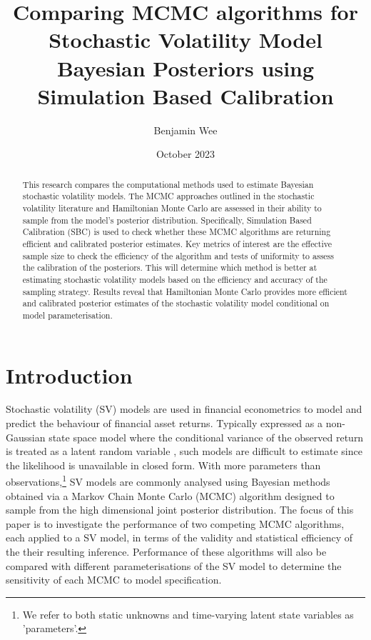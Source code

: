 \documentclass[12pt, a4paper]{article}
\title{Comparing MCMC algorithms for Stochastic Volatility Model Bayesian Posteriors using Simulation Based Calibration}
\author{Benjamin Wee}
\date{October 2023}
\begin{document}
\maketitle 

\begin{abstract}
    This research compares the computational methods used to estimate Bayesian stochastic volatility models. The MCMC approaches outlined in the stochastic volatility literature and Hamiltonian Monte Carlo are assessed in their ability to sample from the model's posterior distribution. Specifically, Simulation Based Calibration (SBC) is used to check whether these MCMC algorithms are returning efficient and calibrated posterior estimates. Key metrics of interest are the effective sample size to check the efficiency of the algorithm and tests of uniformity to assess the calibration of the posteriors. This will determine which method is better at estimating stochastic volatility models based on the efficiency and accuracy of the sampling strategy. Results reveal that Hamiltonian Monte Carlo provides more efficient and calibrated posterior estimates of the stochastic volatility model conditional on model parameterisation. 
\end{abstract}

\newpage

\tableofcontents{\protect\newpage}

\section{Introduction}
    Stochastic volatility (SV) models are used in financial econometrics to model and predict the behaviour of financial asset returns. Typically expressed as a non-Gaussian state space model where the conditional variance of the observed return is treated as a latent random variable \citep{hull1987pricing, chesney1989pricing}, such models are difficult to estimate since the likelihood is unavailable in closed form. With more parameters than observations,\footnote{We refer to both static unknowns and time-varying latent state variables as 'parameters'.} SV models are commonly analysed using Bayesian methods obtained via a Markov Chain Monte Carlo (MCMC) algorithm designed to sample from the high dimensional joint posterior distribution. The focus of this paper is to investigate the performance of two competing MCMC algorithms, each applied to a SV model, in terms of the validity and statistical efficiency of the their resulting inference. Performance of these algorithms will also be compared with different parameterisations of the SV model to determine the sensitivity of each MCMC to model specification.
\end{document}
